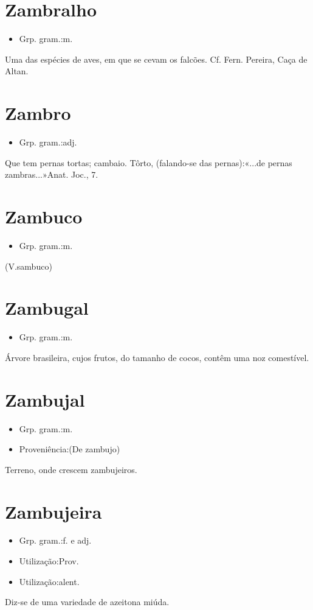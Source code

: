 \section{Zambralho}
\begin{itemize}
\item {Grp. gram.:m.}
\end{itemize}
Uma das espécies de aves, em que se cevam os falcões. Cf. Fern. Pereira, \textunderscore Caça de Altan.\textunderscore 
\section{Zambro}
\begin{itemize}
\item {Grp. gram.:adj.}
\end{itemize}
Que tem pernas tortas; cambaio.
Tôrto, (falando-se das pernas):«\textunderscore ...de pernas zambras...\textunderscore »\textunderscore Anat. Joc.\textunderscore , 7.
\section{Zambuco}
\begin{itemize}
\item {Grp. gram.:m.}
\end{itemize}
(V.sambuco)
\section{Zambugal}
\begin{itemize}
\item {Grp. gram.:m.}
\end{itemize}
Árvore brasileira, cujos frutos, do tamanho de cocos, contêm uma noz comestível.
\section{Zambujal}
\begin{itemize}
\item {Grp. gram.:m.}
\end{itemize}
\begin{itemize}
\item {Proveniência:(De \textunderscore zambujo\textunderscore )}
\end{itemize}
Terreno, onde crescem zambujeiros.
\section{Zambujeira}
\begin{itemize}
\item {Grp. gram.:f.  e  adj.}
\end{itemize}
\begin{itemize}
\item {Utilização:Prov.}
\end{itemize}
\begin{itemize}
\item {Utilização:alent.}
\end{itemize}
Diz-se de uma variedade de azeitona miúda.
